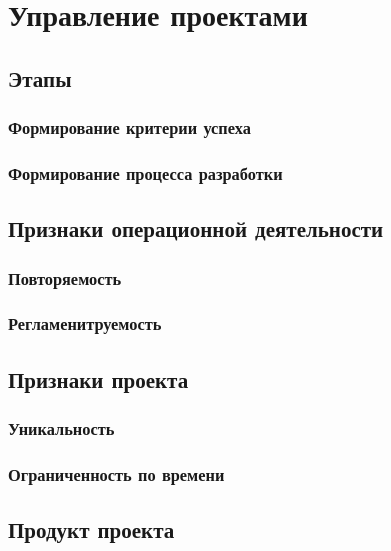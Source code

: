 \chapter{Управление проектами}

\section{Этапы}

\subsection{Формирование критерии успеха}
\subsection{Формирование процесса разработки}

\section{Признаки операционной деятельности}

\subsection{Повторяемость}
\subsection{Регламенитруемость}

\section{Признаки проекта}

\subsection{Уникальность}
\subsection{Ограниченность по времени}

\section{Продукт проекта}
